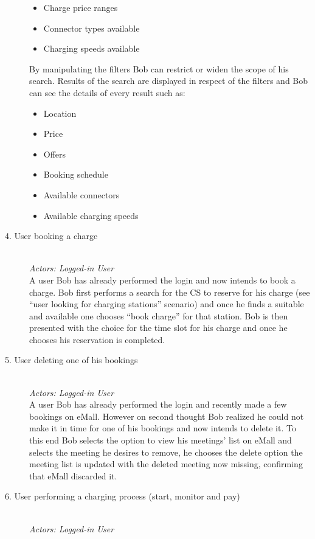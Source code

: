 \documentclass[11pt]{article}
\begin{document}
\begin{description}
\begin{itemize}
            \item Charge price ranges
            \item Connector types available
            \item Charging speeds available
        \end{itemize}
        By manipulating the filters Bob can restrict or widen the scope of his search. Results of the search are displayed in respect of the filters and Bob can see the details of every result such as:
        \begin{itemize}
            \item Location
            \item Price
            \item Offers
            \item Booking schedule
            \item Available connectors
            \item Available charging speeds
        \end{itemize}
    \item [4. User booking a charge] \hfill \\
        \textit{Actors: Logged-in User} \\
        A user Bob has already performed the login and now intends to book a charge. Bob first performs a search for the CS to reserve for his charge (see “user looking for charging stations” scenario) and once he finds a suitable and available one chooses “book charge” for that station. Bob is then presented with the choice for the time slot for his charge and once he chooses his reservation is completed.
    \item [5. User deleting one of his bookings] \hfill \\
        \textit{Actors: Logged-in User} \\
        A user Bob has already performed the login and recently made a few bookings on eMall. However on second thought Bob realized he could not make it in time for one of his bookings and now intends to delete it. To this end Bob selects the option to view his meetings' list on eMall and selects the meeting he desires to remove, he chooses the delete option the meeting list is updated with the deleted meeting now missing, confirming that eMall discarded it.
    \item [6. User performing a charging process (start, monitor and pay)] \hfill \\
        \textit{Actors: Logged-in User} \\

\end{description}
\end{document}
